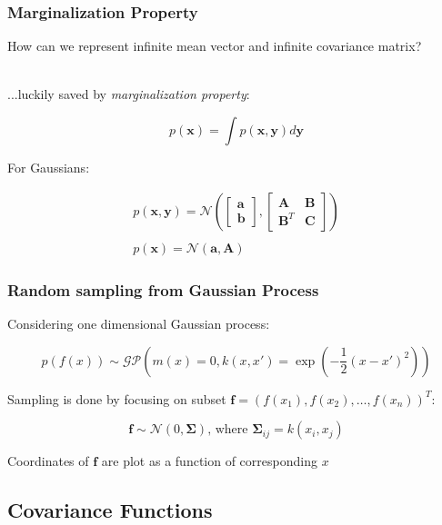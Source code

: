 \documentclass[10pt]{beamer}
\newcommand{\bx}{\mathbf{x}}
\newcommand{\by}{\mathbf{y}}
\newcommand{\ba}{\mathbf{a}}
\newcommand{\bb}{\mathbf{b}}
\newcommand{\boldf}{\mathbf{f}}
\newcommand{\bA}{\mathbf{A}}
\newcommand{\bB}{\mathbf{B}}
\newcommand{\bC}{\mathbf{C}}
\newcommand{\gp}{\mathcal{GP}}
\newcommand{\gaussN}{\mathcal{N}}
\newcommand{\bSig}{\boldsymbol{\Sigma}}
\begin{document}
  \begin{frame}
    \frametitle{Marginalization Property}
    How can we represent infinite mean vector and infinite covariance matrix? \\~

    ...luckily saved by \emph{marginalization property}:

    \begin{equation*}
      p(\bx) = \int p(\bx,\by)d \by
    \end{equation*}

    For Gaussians:

    \begin{equation*}
      \begin{array}{c}
        p(\bx, \by) = \gaussN \left(\begin{bmatrix} \ba \\ \bb \end{bmatrix}, \begin{bmatrix} \bA & \bB \\ \bB^T & \bC \end{bmatrix} \right) \\~\\
        p(\bx) = \gaussN(\ba,\bA)
      \end{array}
    \end{equation*}
  \end{frame}

  \begin{frame}
    \frametitle{Random sampling from Gaussian Process}
    Considering one dimensional Gaussian process:

    \begin{equation*}
      p(f(x)) \sim \gp \left( m(x) = 0, k(x,x') = \exp \left( - \frac{1}{2} (x - x')^2 \right) \right)
    \end{equation*}

    Sampling is done by focusing on subset $\boldf = (f(x_1), f(x_2),\dots,f(x_n))^T$:

    \begin{equation*}
      \boldf \sim \gaussN(0,\bSig) \text{, where } \bSig_{ij} = k(x_i,x_j)
    \end{equation*}

    Coordinates of $\boldf$ are plot as a function of corresponding $x$
  \end{frame}

  \subsection{Covariance Functions}
\end{document}
